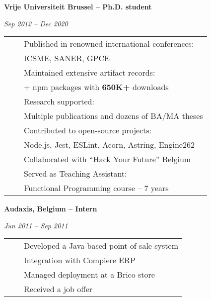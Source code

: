 \documentclass[a4paper,11pt,english]{article}
\newcommand{\RightColumn}[0]{10.5cm}
\newcommand{\ItemSkip}[0]{4pt}
\newcommand{\SubItemSkip}[0]{0pt}
\newcommand{\SubSubItemSkip}[0]{0pt}
\newcommand{\Bullet}[0]{\faCaretRight~~}
\newcommand{\BeginSubRubricSkip}[0]{6pt}
\newcommand{\EndSubRubric}[0]{\vspace{4pt}}
\newcommand{\SubRubric}[1]{\parbox{\linewidth}{\sffamily\bfseries{}#1}}
\begin{document}
\begin{minipage}[t]{\RightColumn}
\SubRubric{Vrije Universiteit Brussel -- Ph.D. student}
\emph{Sep 2012 -- Dec 2020} \\[\BeginSubRubricSkip]
\begin{tabularx}{\linewidth}{@{}l@{}l@{}}
\Bullet & Published in renowned international conferences: \\[\SubSubItemSkip]
& \quad ICSME, SANER, GPCE \\[\ItemSkip]
\Bullet & Maintained extensive artifact records: \\[\SubSubItemSkip]
& \quad 60+ npm packages with \textbf{650K+} downloads \\[\ItemSkip]
\Bullet & Research supported: \\[\SubSubItemSkip]
& \quad Multiple publications and dozens of BA/MA theses \\[\ItemSkip]
\Bullet & Contributed to open-source projects: \\[\SubSubItemSkip]
& \quad Node.js, Jest, ESLint, Acorn, Astring, Engine262 \\[\ItemSkip]
\Bullet & Collaborated with ``Hack Your Future'' Belgium \\[\ItemSkip]
\Bullet & Served as Teaching Assistant: \\[\SubSubItemSkip]
& \quad Functional Programming course -- 7 years \\[\ItemSkip]
\end{tabularx}
\EndSubRubric{}

\SubRubric{Audaxis, Belgium -- Intern}
\emph{Jun 2011 -- Sep 2011} \\[\BeginSubRubricSkip]
\begin{tabularx}{\linewidth}{@{}l@{}l@{}}
\Bullet & Developed a Java-based point-of-sale system \\[\SubItemSkip]
& Integration with Compiere ERP \\[\SubItemSkip]
& Managed deployment at a Brico store \\[\ItemSkip]
\Bullet & Received a job offer \\[\ItemSkip]
\end{tabularx}
\EndSubRubric{}

\end{minipage}

\newpage
\end{document}
